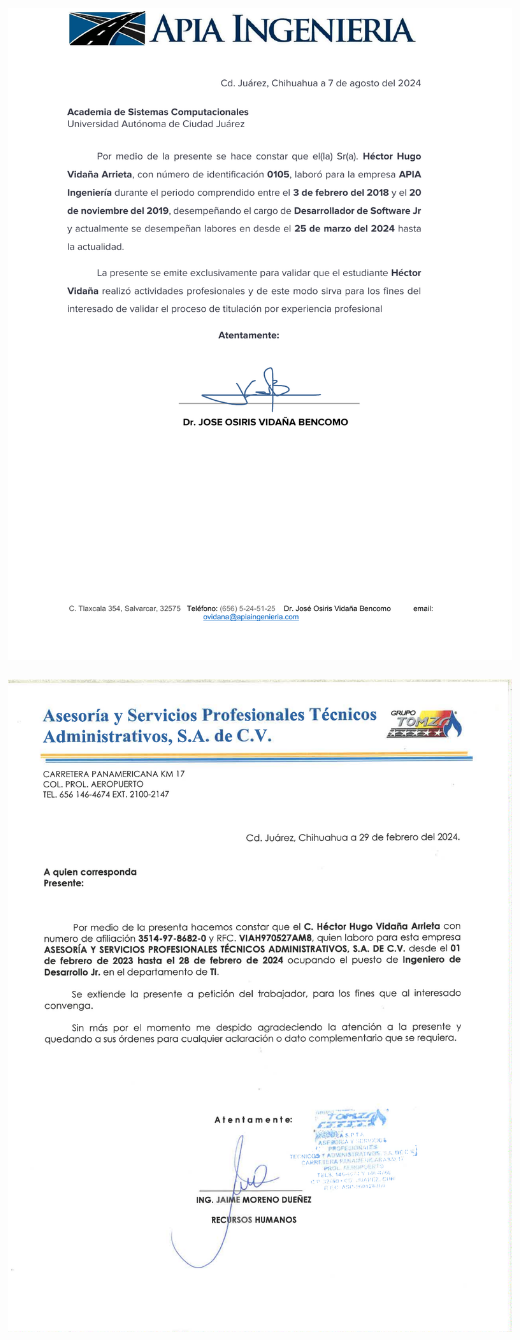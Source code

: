 \documentclass[final, fmstyle, 12pt]{article}
\begin{document}
\begin{center}
\includegraphics[scale=0.7]{Imagenes/Pdf/firma2.pdf}

\includegraphics[scale=0.7]{Imagenes/Pdf/firma3.pdf}

\end{center}
\end{document}
